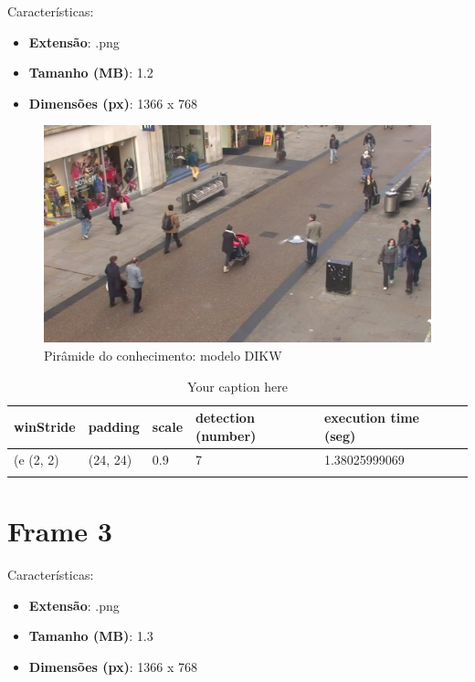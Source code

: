 Características: 
\begin{itemize}
	\item \textbf{Extensão}: .png
	\item \textbf{Tamanho (MB)}: 1.2
	\item \textbf{Dimensões (px)}: 1366 x 768
\end{itemize}


\begin{figure}[!htb]
	\centering
	\includegraphics[scale=0.25]{img/vision/frame2.png}
	\caption{Pirâmide do conhecimento: modelo DIKW}
	\label{db}
\end{figure}



\begin{longtable}{|l|l|l|l|l|l|} 
\hline
\textbf{winStride} & \textbf{padding} & \textbf{scale} & \textbf{detection (number)} & \textbf{execution time (seg)} \\ \hline
(e
(2, 2) & (24, 24) & 0.9 & 7 & 1.38025999069 \\ \hline

	\caption{Your caption here} %
	\label{tab:myfirstlongtable}
\end{longtable}



\section{Frame 3}


Características: 
\begin{itemize}
	\item \textbf{Extensão}: .png
	\item \textbf{Tamanho (MB)}: 1.3
	\item \textbf{Dimensões (px)}: 1366 x 768
\end{itemize}


